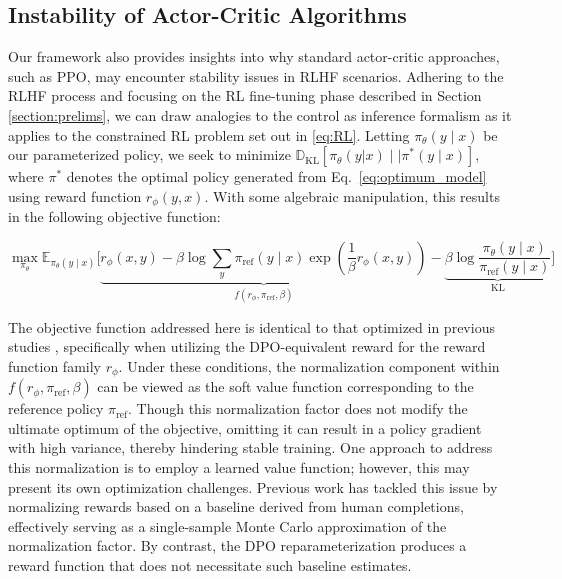 \subsection{Instability of Actor-Critic Algorithms} Our framework also provides insights into why standard actor-critic approaches, such as PPO, may encounter stability issues in RLHF scenarios. Adhering to the RLHF process and focusing on the RL fine-tuning phase described in Section \ref{section:prelims}, we can draw analogies to the control as inference formalism \cite{levine2018reinforcement} as it applies to the constrained RL problem set out in \ref{eq:RL}. Letting $\pi_{\theta}(y\mid x)$ be our parameterized policy, we seek to minimize $\mathbb{D}_{\text{KL}}[\pi_{\theta}(y|x) \mid \mid \pi^*(y\mid x)]$, where $\pi^*$ denotes the optimal policy generated from Eq.~\ref{eq:optimum_model} using reward function $r_{\phi}(y, x)$. With some algebraic manipulation, this results in the following objective function:

\begin{equation}\label{eq:AC}
    \max_{\pi_{\theta}}\mathbb{E}_{\pi_{\theta}(y\mid x)}\bigg[\underbrace{r_{\phi}(x, y) -\beta\log\sum_{y}\pi_\text{ref}(y\mid x)\exp\left(\frac{1}{\beta}r_{\phi}(x, y)\right)}_{f(r_{\phi}, \pi_\text{ref}, \beta)} - \underbrace{\beta\log\frac{\pi_{\theta}(y\mid x)}{\pi_\text{ref}(y\mid x)}}_{\text{KL}}\bigg]
\end{equation}

The objective function addressed here is identical to that optimized in previous studies 
\citep{ziegler2020finetuning, stiennon2022learning, bai2022training, ouyang2022training}, specifically when utilizing the DPO-equivalent reward for the reward function family $r_{\phi}$. Under these conditions, the normalization component within $f(r_{\phi}, \pi_\text{ref}, \beta)$ can be viewed as the soft value function corresponding to the reference policy $\pi_\text{ref}$. Though this normalization factor does not modify the ultimate optimum of the objective, omitting it can result in a policy gradient with high variance, thereby hindering stable training. One approach to address this normalization is to employ a learned value function; however, this may present its own optimization challenges. Previous work has tackled this issue by normalizing rewards based on a baseline derived from human completions, effectively serving as a single-sample Monte Carlo approximation of the normalization factor. By contrast, the DPO reparameterization produces a reward function that does not necessitate such baseline estimates.

